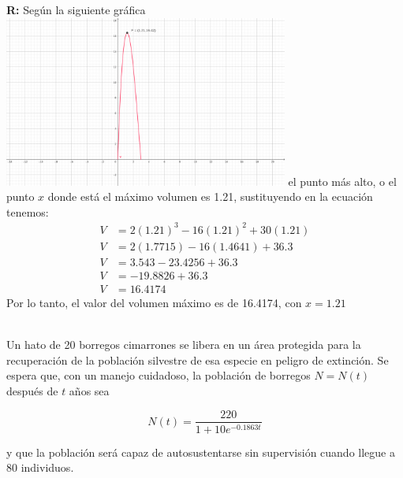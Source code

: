 \documentclass[12pt]{article}
\begin{document}
\begin{enumerate}
    
    {\bf R:} Según la siguiente gráfica\\
    \includegraphics[width=0.7\textwidth, center]{graficacaja.png}
    el punto más alto, o el punto $x$ donde está el máximo volumen es 1.21, sustituyendo en la ecuación tenemos:
    \begin{align*}
    V&=2(1.21)^3-16(1.21)^2+30(1.21)\\
    V&=2(1.7715)-16(1.4641)+36.3\\
    V&=3.543-23.4256+36.3\\
    V&=-19.8826+36.3\\
    V&=16.4174
    \end{align*}
    Por lo tanto, el valor del volumen máximo es de 16.4174, con $x=1.21$
\end{enumerate}

     \\
    Un hato de 20 borregos cimarrones se libera en un área protegida para la recuperación de la población silvestre de esa especie en peligro de extinción. Se espera que, con un manejo cuidadoso, la población de borregos \( N = N(t) \) después de \( t \) años sea

\[
N(t) = \frac{220}{1 + 10 e^{-0.1863 t}}
\]

y que la población será capaz de autosustentarse sin supervisión cuando llegue a 80 individuos.
\end{document}
